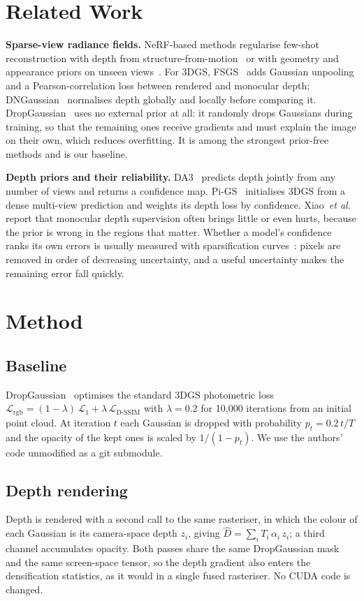 \section{Related Work}

\textbf{Sparse-view radiance fields.} NeRF-based methods regularise few-shot reconstruction with depth from structure-from-motion~\cite{dsnerf} or with geometry and appearance priors on unseen views~\cite{regnerf}. For 3DGS, FSGS~\cite{fsgs} adds Gaussian unpooling and a Pearson-correlation loss between rendered and monocular depth; DNGaussian~\cite{dngaussian} normalises depth globally and locally before comparing it. DropGaussian~\cite{dropgaussian} uses no external prior at all: it randomly drops Gaussians during training, so that the remaining ones receive gradients and must explain the image on their own, which reduces overfitting. It is among the strongest prior-free methods and is our baseline.

\textbf{Depth priors and their reliability.} DA3~\cite{da3} predicts depth jointly from any number of views and returns a confidence map. Pi-GS~\cite{pigs} initialises 3DGS from a dense multi-view prediction and weights its depth loss by confidence. Xiao~\emph{et al.}~\cite{indepth} report that monocular depth supervision often brings little or even hurts, because the prior is wrong in the regions that matter. Whether a model's confidence ranks its own errors is usually measured with sparsification curves~\cite{ilg2018,poggi2020}: pixels are removed in order of decreasing uncertainty, and a useful uncertainty makes the remaining error fall quickly.

\section{Method}

\subsection{Baseline}
DropGaussian~\cite{dropgaussian} optimises the standard 3DGS photometric loss $\mathcal{L}_{\text{rgb}} = (1-\lambda)\,\mathcal{L}_1 + \lambda\,\mathcal{L}_{\text{D-SSIM}}$ with $\lambda = 0.2$ for 10{,}000 iterations from an initial point cloud. At iteration $t$ each Gaussian is dropped with probability $p_t = 0.2\,t/T$ and the opacity of the kept ones is scaled by $1/(1-p_t)$. We use the authors' code unmodified as a git submodule.

\subsection{Depth rendering}
Depth is rendered with a second call to the same rasteriser, in which the colour of each Gaussian is its camera-space depth $z_i$, giving $\hat D = \sum_i T_i\,\alpha_i\,z_i$; a third channel accumulates opacity. Both passes share the same DropGaussian mask and the same screen-space tensor, so the depth gradient also enters the densification statistics, as it would in a single fused rasteriser. No CUDA code is changed.

